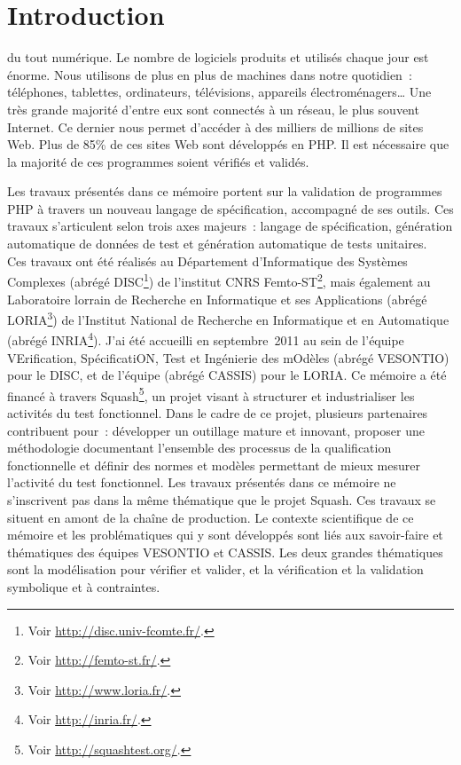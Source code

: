 \chapter{Introduction}
\label{chapter:introduction}

\mminitoc

 du tout numérique. Le nombre de logiciels produits et utilisés
chaque jour est énorme. Nous utilisons de plus en plus de machines dans notre
quotidien~: téléphones, tablettes, ordinateurs, télévisions, appareils
électroménagers… Une très grande majorité d'entre eux sont connectés à un
réseau, le plus souvent Internet. Ce dernier nous permet d'accéder à des
milliers de millions de sites Web. Plus de 85\% de ces sites Web sont développés
en PHP. Il est nécessaire que la majorité de ces programmes soient vérifiés et
validés.

Les travaux présentés dans ce mémoire portent sur la validation de programmes
PHP à travers un nouveau langage de spécification, accompagné de ses outils. Ces
travaux s'articulent selon trois axes majeurs~: langage de spécification,
génération automatique de données de test et génération automatique de tests
unitaires. \\

Ces travaux ont été réalisés au Département d'Informatique des Systèmes
Complexes (abrégé DISC\footnote{Voir \url{http://disc.univ-fcomte.fr/}.}) de
l'institut CNRS Femto-ST\footnote{Voir \url{http://femto-st.fr/}.}, mais
également au Laboratoire lorrain de Recherche en Informatique et ses
Applications (abrégé LORIA\footnote{Voir \url{http://www.loria.fr/}.}) de
l'Institut National de Recherche en Informatique et en Automatique (abrégé
INRIA\footnote{Voir \url{http://inria.fr/}.}). J'ai été accueilli en
septembre~2011 au sein de l'équipe VErification, SpécificatiON, Test et
Ingénierie des mOdèles (abrégé VESONTIO) pour le DISC, et de l'équipe
(abrégé CASSIS) pour le LORIA. Ce mémoire a été financé à travers
Squash\footnote{Voir \url{http://squashtest.org/}.}, un projet
 visant à structurer et industrialiser les activités du
test fonctionnel. Dans le cadre de ce projet, plusieurs partenaires contribuent
pour~: développer un outillage  mature et innovant,
proposer une méthodologie  documentant l'ensemble des
processus de la qualification fonctionnelle et définir des normes et modèles
permettant de mieux mesurer l'activité du test fonctionnel. Les travaux
présentés dans ce mémoire ne s'inscrivent pas dans la même thématique que le
projet Squash. Ces travaux se situent en amont de la chaîne de production. Le
contexte scientifique de ce mémoire et les problématiques qui y sont développés
sont liés aux savoir-faire et thématiques des équipes VESONTIO et CASSIS. Les
deux grandes thématiques sont la modélisation pour vérifier et valider, et la
vérification et la validation symbolique et à contraintes. \\

